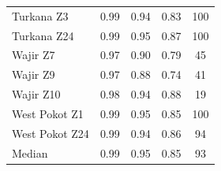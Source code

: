 \documentclass[review]{elsarticle}
\begin{document}
\begin{table}
\begin{tabular}{l|ccc|c}
		Turkana Z3 & 	0.99 	& 	 	0.94 	&  	0.83	& 100	\\
		Turkana Z24 & 	0.99 	& 	 	0.95 	&  	0.87	& 100	 \\
		Wajir Z7 &  	0.97 	& 	 	0.90 	&  	0.79 & 45	\\
		Wajir Z9 &  	0.97 	& 	 	0.88 	&  	0.74 & 41	\\
		Wajir Z10&  	0.98 	& 	 	0.94 	&  	0.88 & 19	\\
		West Pokot Z1 & 	0.99 	& 	 	0.95 	&  	0.85 & 100		\\
		West Pokot Z24 & 	0.99 	& 	 	0.94 	&  	0.86 & 94		\\
		\bottomrule
		Median &  0.99 &  0.95 & 0.85 & 93\\
		\bottomrule
	\end{tabular}
\end{table}
\end{document}

